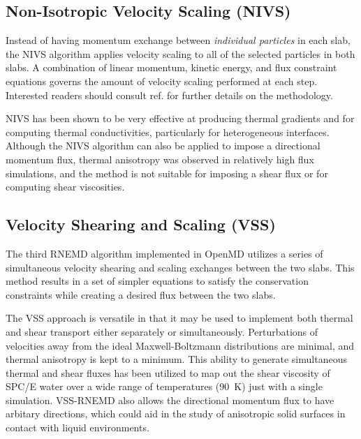 \documentclass[letterpaper]{report}
\begin{document}
\subsection{\label{subsection:nivs}Non-Isotropic Velocity Scaling (NIVS)}
Instead of having momentum exchange between {\it individual particles}
in each slab, the NIVS algorithm applies velocity scaling to all of
the selected particles in both slabs.\cite{kuang:164101} A combination of linear
momentum, kinetic energy, and flux constraint equations governs the
amount of velocity scaling performed at each step. Interested readers
should consult ref.  for further details on the
methodology.

NIVS has been shown to be very effective at producing thermal
gradients and for computing thermal conductivities, particularly for
heterogeneous interfaces.  Although the NIVS algorithm can also be
applied to impose a directional momentum flux, thermal anisotropy was
observed in relatively high flux simulations, and the method is not
suitable for imposing a shear flux or for computing shear viscosities.

\subsection{\label{subsection:vss}Velocity Shearing and Scaling (VSS)}
The third RNEMD algorithm implemented in OpenMD utilizes a series of
simultaneous velocity shearing and scaling exchanges between the two
slabs.\cite{2012MolPh.110..691K}  This method results in a set of simpler equations to satisfy
the conservation constraints while creating a desired flux between the
two slabs.

The VSS approach is versatile in that it may be used to implement both
thermal and shear transport either separately or simultaneously.
Perturbations of velocities away from the ideal Maxwell-Boltzmann
distributions are minimal, and thermal anisotropy is kept to a
minimum.  This ability to generate simultaneous thermal and shear
fluxes has been utilized to map out the shear viscosity of SPC/E water
over a wide range of temperatures (90~K) just with a single simulation.
VSS-RNEMD also allows the directional momentum flux to have
arbitary directions, which could aid in the study of anisotropic solid
surfaces in contact with liquid environments.
\end{document}
